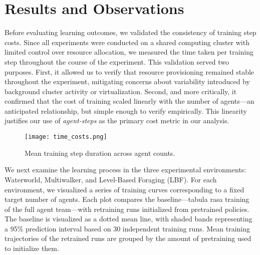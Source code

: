 \documentclass{article}
\begin{document}
        


\FloatBarrier
\section{Results and Observations}

Before evaluating learning outcomes, we validated the consistency of training step costs.
Since all experiments were conducted on a shared computing cluster with limited 
control over resource allocation, we measured the time taken per training
step throughout the course of the experiment. This validation served two purposes. First, 
it allowed us to verify that resource provisioning remained stable throughout the experiment, 
mitigating concerns about variability introduced by background cluster activity or virtualization.
Second, and more critically, it confirmed that the cost of training scaled linearly 
with the number of agents—an anticipated relationship, but simple enough to verify empirically.
This linearity justifies our use of \emph{agent-steps} as the primary cost metric in our analysis.
\begin{figure}[!h]
    \centering
    \texttt{[image: time\_costs.png]}
    \caption{Mean training step duration across agent counts.}
    \label{fig:agent-steps}
\end{figure}


We next examine the learning process in the three experimental environments: 
Waterworld, Multiwalker, and Level-Based Foraging (LBF). For each environment, 
we visualized a series of training curves corresponding to a fixed target number of agents.
Each plot compares the baseline—tabula rasa training of the full agent team—with 
retraining runs initialized from pretrained policies.
The baseline is visualized as a dotted mean line, with shaded bands 
representing a 95\% prediction interval based on 30 independent training runs.
Mean training trajectories of the retrained runs are grouped by the amount 
of pretraining used to initialize them.
\end{document}
